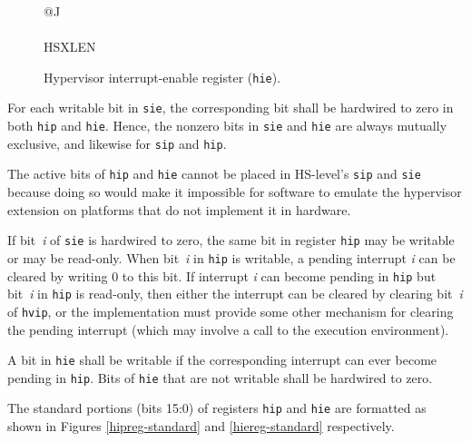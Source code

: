 \begin{figure}[h!]
{\footnotesize
\begin{center}
\begin{tabular}{@{}J}
 \\
\hline
{} \\
\hline
HSXLEN \\
\end{tabular}
\end{center}
}
\vspace{-0.1in}
\caption{Hypervisor interrupt-enable register ({\tt hie}).}
\label{hiereg}
\end{figure}

For each writable bit in {\tt sie}, the corresponding bit shall be
hardwired to zero in both {\tt hip} and {\tt hie}.
Hence, the nonzero bits in {\tt sie} and {\tt hie} are always mutually
exclusive, and likewise for {\tt sip} and {\tt hip}.

\begin{commentary}
The active bits of {\tt hip} and {\tt hie} cannot be placed in HS-level's
{\tt sip} and {\tt sie} because doing so would make it impossible for
software to emulate the hypervisor extension on platforms that do not
implement it in hardware.
\end{commentary}

If bit~\textit{i} of {\tt sie} is hardwired to zero, the same bit in
register {\tt hip} may be writable or may be read-only.
When bit~\textit{i} in {\tt hip} is writable, a pending interrupt
\textit{i} can be cleared by writing 0 to this bit.
If interrupt \textit{i} can become pending in {\tt hip} but
bit~\textit{i} in {\tt hip} is read-only, then either
the interrupt can be cleared by clearing bit~\textit{i}
of {\tt hvip}, or the implementation must provide
some other mechanism for clearing the pending interrupt (which may
involve a call to the execution environment).

A bit in {\tt hie} shall be writable if the corresponding interrupt can
ever become pending in {\tt hip}.
Bits of {\tt hie} that are not writable shall be hardwired to zero.

The standard portions (bits 15:0) of registers {\tt hip} and {\tt hie}
are formatted as shown in Figures \ref{hipreg-standard} and
\ref{hiereg-standard} respectively.

